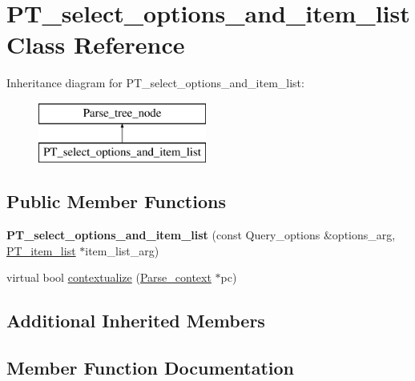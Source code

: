 \hypertarget{classPT__select__options__and__item__list}{}\section{P\+T\+\_\+select\+\_\+options\+\_\+and\+\_\+item\+\_\+list Class Reference}
\label{classPT__select__options__and__item__list}
Inheritance diagram for P\+T\+\_\+select\+\_\+options\+\_\+and\+\_\+item\+\_\+list\+:\begin{figure}[H]
\begin{center}
\leavevmode
\includegraphics[height=2.000000cm]{classPT__select__options__and__item__list}
\end{center}
\end{figure}
\subsection*{Public Member Functions}
\begin{DoxyCompactItemize}
\item 
\mbox{\label{classPT__select__options__and__item__list_a153e99fc0bb8c1bccc98055aee9ccb61}} 
{\bfseries P\+T\+\_\+select\+\_\+options\+\_\+and\+\_\+item\+\_\+list} (const Query\+\_\+options \&options\+\_\+arg, \mbox{\hyperlink{classPT__item__list}{P\+T\+\_\+item\+\_\+list}} $\ast$item\+\_\+list\+\_\+arg)
\item 
virtual bool \mbox{\hyperlink{classPT__select__options__and__item__list_a32783a2dca4321880f0470e4b3517b63}{contextualize}} (\mbox{\hyperlink{structParse__context}{Parse\+\_\+context}} $\ast$pc)
\end{DoxyCompactItemize}
\subsection*{Additional Inherited Members}


\subsection{Member Function Documentation}
\mbox{\label{classPT__select__options__and__item__list_a32783a2dca4321880f0470e4b3517b63}} 
